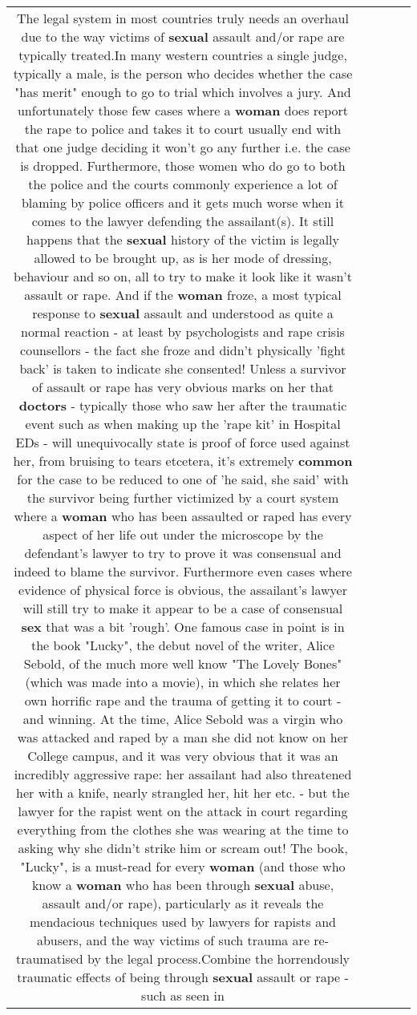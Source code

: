 \documentclass[11pt]{article}
\newlength\mylength
\begin{document}
\begin{center}
\begin{longtable}{|C{.65\mylength}|C{.30\mylength}|C{.12\mylength}|C{.12\mylength}|C{.12\mylength}|}
  \small The legal system in most countries truly needs an overhaul due to the way victims of \textbf{sexual} assault and/or rape are typically treated.In many western countries a single judge, typically a male, is the person who decides whether the case "has merit" enough to go to trial which involves a jury. And unfortunately those few cases where a \textbf{woman} does report the rape to police and takes it to court usually end with that one judge deciding it won't go any further i.e. the case is dropped. Furthermore, those women who do go to both the police and the courts commonly experience a lot of blaming by police officers and it gets much worse when it comes to the lawyer defending the assailant(s).   It still happens that the \textbf{sexual} history of the victim is legally allowed to be brought up, as is her mode of dressing, behaviour and so on, all to try to make it look like it wasn't assault or rape. And if the \textbf{woman} froze, a most typical response to \textbf{sexual} assault and understood as quite a normal reaction -  at least by psychologists and rape crisis counsellors - the fact she froze and didn't physically 'fight back' is taken to indicate she consented! Unless a survivor of assault or rape has very obvious marks on her that \textbf{doctors} - typically those who saw her after the traumatic event such as when making up the 'rape kit' in Hospital EDs - will unequivocally state is proof of force used against her, from bruising to tears etcetera, it's extremely \textbf{common} for the case to be reduced to one of 'he said, she said' with the survivor being further victimized by a court system where a \textbf{woman} who has been assaulted or raped has every aspect of her life out under the microscope by the defendant's lawyer to try to prove it was consensual and indeed to blame the survivor. Furthermore even cases where evidence of physical force is obvious, the assailant's lawyer will still try to make it appear to be a case of consensual \textbf{sex} that was a bit 'rough'. One famous case in point is in the book "Lucky", the debut novel of the writer, Alice Sebold, of the much more well know "The Lovely Bones" (which was made into a movie), in which she relates her own horrific rape and the trauma of getting it to court - and winning. At the time, Alice Sebold was a virgin who was attacked and raped by a man she did not know on her College campus, and it was very obvious that it was an incredibly aggressive rape: her assailant had also threatened her with a knife, nearly strangled her, hit her etc. - but the lawyer for the rapist went on the attack in court regarding everything from the clothes she was wearing at the time to asking why she didn't strike him or scream out! The book, "Lucky", is a must-read for every \textbf{woman} (and those who know a \textbf{woman} who has been through \textbf{sexual} abuse, assault and/or rape), particularly as it reveals the mendacious techniques used by lawyers for rapists and abusers, and the way victims of such trauma are re-traumatised by the legal process.Combine the horrendously traumatic effects of being through \textbf{sexual} assault or rape - such as seen in 
\end{longtable}
\end{center}
\end{document}
